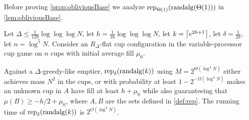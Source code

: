 Before proving \cref{prop:obliviousBase} we analyze
$\operatorname{\text{\textup{rep}}}_{\Theta(1)}(\operatorname{\text{\textup{randalg}}}(\Theta(1)))$ in
\cref{lem:obliviousBase}.
\begin{lemma}
  \label{lem:obliviousBase}
  Let $\Delta \le \frac{1}{128}\log\log\log N$, let $h =
  \frac{1}{16}\log\log\log N$, let $k=\left\lceil e^{2h+1} \right\rceil$, let
  $\delta = \frac{1}{2k}$, let $n = \log^5 N$. Consider an
  $R_\Delta$-flat cup configuration in the variable-processor cup
  game on $n$ cups with initial average fill $\mu_0$.

  Against a $\Delta$-greedy-like emptier,
  $\operatorname{\text{\textup{rep}}}_{\delta}(\operatorname{\text{\textup{randalg}}}(k))$ using $M = 2^{\Theta(\log^4 N)}$
  either achieves mass $N^2$ in the cups, or with probability at
  least $1-2^{-\Omega(\log^4 N)}$ makes an unknown cup in $A$
  have fill at least $h+\mu_0$ while also
  guaranteeing that $\mu(B) \ge -h/2 + \mu_0$, where $A,B$ are
  the sets defined in \cref{def:rep}. The running time of
  $\operatorname{\text{\textup{rep}}}_{\delta}(\operatorname{\text{\textup{randalg}}}(k))$ is $2^{O(\log^4 N)}$.
\end{lemma}
